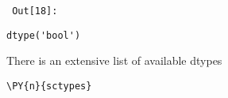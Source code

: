         {\par%
        \vspace{-1\smallerfontscale}%
        \noindent%
        \begin{minipage}{\cellleftmargin}%
    \hfill%
    {\smaller%
    \tt%
    \color{nbframe-out-prompt}%
    Out[18]:}%
    \hspace{\inputpadding}%
    \hspace{0em}%
    \hspace{3pt}%
    \end{minipage}%
        }%
    \begin{addmargin}[\cellleftmargin]{0em}%
    {\smaller%
    \vspace{-1\smallerfontscale}%
    
    
    
    \begin{verbatim}
dtype('bool')
    \end{verbatim}

    
}%
    \end{addmargin}%
    There is an extensive list of available dtypes


{\par%
\vspace{-1\baselineskip}%
}%
\begin{notebookcell}[19]%
\begin{addmargin}[\cellleftmargin]{0em}%
{\smaller%
\par%
%
\vspace{-1\smallerfontscale}%
\begin{Verbatim}[commandchars=\\\{\}]
\PY{n}{sctypes}
\end{Verbatim}
%
\par%
\vspace{-1\smallerfontscale}}%
\end{addmargin}
\end{notebookcell}

\par\vspace{1\smallerfontscale}%
    
